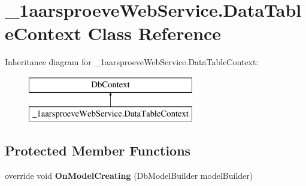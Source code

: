 \hypertarget{class__1aarsproeve_web_service_1_1_data_table_context}{}\section{\+\_\+1aarsproeve\+Web\+Service.\+Data\+Table\+Context Class Reference}
\label{class__1aarsproeve_web_service_1_1_data_table_context}
Inheritance diagram for \+\_\+1aarsproeve\+Web\+Service.\+Data\+Table\+Context\+:\begin{figure}[H]
\begin{center}
\leavevmode
\includegraphics[height=2.000000cm]{class__1aarsproeve_web_service_1_1_data_table_context}
\end{center}
\end{figure}
\subsection*{Protected Member Functions}
\begin{DoxyCompactItemize}
\item 
\hypertarget{class__1aarsproeve_web_service_1_1_data_table_context_a1870da483bf621367881ed775f14688d}{}override void {\bfseries On\+Model\+Creating} (Db\+Model\+Builder model\+Builder)\label{class__1aarsproeve_web_service_1_1_data_table_context_a1870da483bf621367881ed775f14688d}

\end{DoxyCompactItemize}
